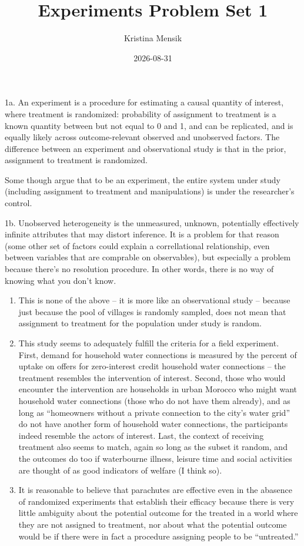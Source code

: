 \documentclass[
]{article}
\title{Experiments Problem Set 1}
\author{Kristina Mensik}
\date{2026-08-31}
\begin{document}
\maketitle

1a. An experiment is a procedure for estimating a causal quantity of
interest, where treatment is randomized: probability of assignment to
treatment is a known quantity between but not equal to 0 and 1, and can
be replicated, and is equally likely across outcome-relevant observed
and unobserved factors. The difference between an experiment and
observational study is that in the prior, assignment to treatment is
randomized.

Some though argue that to be an experiment, the entire system under
study (including assignment to treatment and manipulations) is under the
researcher's control.

1b. Unobserved heterogeneity is the unmeasured, unknown, potentially
effectively infinite attributes that may distort inference. It is a
problem for that reason (some other set of factors could explain a
correllational relationship, even between variables that are comprable
on observables), but especially a problem because there's no resolution
procedure. In other words, there is no way of knowing what you don't
know.

\begin{enumerate}
\def\labelenumi{\arabic{enumi}.}
\setcounter{enumi}{1}
\item
  This is none of the above -- it is more like an observational study --
  because just because the pool of villages is randomly sampled, does
  not mean that assignment to treatment for the population under study
  is random.
\item
  This study seems to adequately fulfill the criteria for a field
  experiment. First, demand for household water connections is measured
  by the percent of uptake on offers for zero-interest credit household
  water connections -- the treatment resembles the intervention of
  interest. Second, those who would encounter the intervention are
  households in urban Morocco who might want household water connections
  (those who do not have them already), and as long as ``homeowners
  without a private connection to the city's water grid'' do not have
  another form of household water connections, the participants indeed
  resemble the actors of interest. Last, the context of receiving
  treatment also seems to match, again so long as the subset it random,
  and the outcomes do too if waterbourne illness, leisure time and
  social activities are thought of as good indicators of welfare (I
  think so).
\item
  It is reasonable to believe that parachutes are effective even in the
  abasence of randomized experiments that establish their efficacy
  because there is very little ambiguity about the potential outcome for
  the treated in a world where they are not assigned to treatment, nor
  about what the potential outcome would be if there were in fact a
  procedure assigning people to be ``untreated.''
\end{enumerate}
\end{document}
